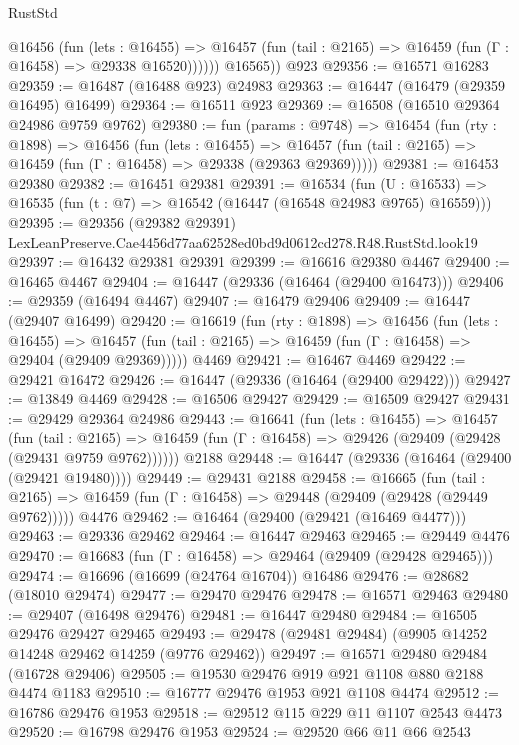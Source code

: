 \begin{lexlean}{RustStd}
\begin{coremodule}
            @16456
              (fun (lets : @16455) =>
              @16457 (fun (tail : @2165) => @16459 (fun (Γ : @16458) => @29338 @16520))))))
        @16565))
    @923
@29356 := @16571 @16283
@29359 := @16487 (@16488 @923) @24983
@29363 := @16447 (@16479 (@29359 @16495) @16499)
@29364 := @16511 @923
@29369 := @16508 (@16510 @29364 @24986 @9759 @9762)
@29380 := fun (params : @9748) =>
  @16454
    (fun (rty : @1898) =>
    @16456
      (fun (lets : @16455) =>
      @16457 (fun (tail : @2165) => @16459 (fun (Γ : @16458) => @29338 (@29363 @29369)))))
@29381 := @16453 @29380
@29382 := @16451 @29381
@29391 := @16534
    (fun (U : @16533) => @16535 (fun (t : @7) => @16542 (@16447 (@16548 @24983 @9765) @16559)))
@29395 := @29356
    (@29382 @29391)
    LexLeanPreserve.Cae4456d77aa62528ed0bd9d0612cd278.R48.RustStd.look19
@29397 := @16432 @29381 @29391
@29399 := @16616 @29380 @4467
@29400 := @16465 @4467
@29404 := @16447 (@29336 (@16464 (@29400 @16473)))
@29406 := @29359 (@16494 @4467)
@29407 := @16479 @29406
@29409 := @16447 (@29407 @16499)
@29420 := @16619
    (fun (rty : @1898) =>
    @16456
      (fun (lets : @16455) =>
      @16457 (fun (tail : @2165) => @16459 (fun (Γ : @16458) => @29404 (@29409 @29369)))))
    @4469
@29421 := @16467 @4469
@29422 := @29421 @16472
@29426 := @16447 (@29336 (@16464 (@29400 @29422)))
@29427 := @13849 @4469
@29428 := @16506 @29427
@29429 := @16509 @29427
@29431 := @29429 @29364 @24986
@29443 := @16641
    (fun (lets : @16455) =>
    @16457
      (fun (tail : @2165) =>
      @16459 (fun (Γ : @16458) => @29426 (@29409 (@29428 (@29431 @9759 @9762))))))
    @2188
@29448 := @16447 (@29336 (@16464 (@29400 (@29421 @19480))))
@29449 := @29431 @2188
@29458 := @16665
    (fun (tail : @2165) => @16459 (fun (Γ : @16458) => @29448 (@29409 (@29428 (@29449 @9762)))))
    @4476
@29462 := @16464 (@29400 (@29421 (@16469 @4477)))
@29463 := @29336 @29462
@29464 := @16447 @29463
@29465 := @29449 @4476
@29470 := @16683 (fun (Γ : @16458) => @29464 (@29409 (@29428 @29465)))
@29474 := @16696 (@16699 (@24764 @16704)) @16486
@29476 := @28682 (@18010 @29474)
@29477 := @29470 @29476
@29478 := @16571 @29463
@29480 := @29407 (@16498 @29476)
@29481 := @16447 @29480
@29484 := @16505 @29476 @29427 @29465
@29493 := @29478 (@29481 @29484) (@9905 @14252 @14248 @29462 @14259 (@9776 @29462))
@29497 := @16571 @29480 @29484 (@16728 @29406)
@29505 := @19530 @29476 @919 @921 @1108 @880 @2188 @4474 @1183
@29510 := @16777 @29476 @1953 @921 @1108 @4474
@29512 := @16786 @29476 @1953
@29518 := @29512 @115 @229 @11 @1107 @2543 @4473
@29520 := @16798 @29476 @1953
@29524 := @29520 @66 @11 @66 @2543

\end{coremodule}
\end{lexlean}
